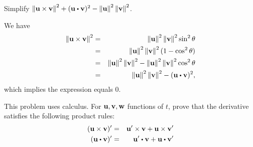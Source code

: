 \begin{ex}
  Simplify
  $\norm{\vect{u}\times \vect{v}} ^{2}+(\vect{u}\dotprod
    \vect{v}) ^{2}-\norm{\vect{u}} ^{2}\norm{ \vect{v}} ^{2}$.
  \begin{sol}
    We have
    \begin{eqnarray*}
      \norm{\vect{u}\times \vect{v}} ^{2}
      &=&\norm{\vect{u}
          } ^{2}\norm{\vect{v}} ^{2}\sin ^{2}\theta \\
      &=&\norm{\vect{u}} ^{2}\norm{\vect{v}}
          ^{2}(1-\cos ^{2}\theta) \\
      &=&\norm{\vect{u}} ^{2}\norm{\vect{v}}
          ^{2}-\norm{\vect{u}} ^{2}\norm{\vect{v}}
          ^{2}\cos ^{2}\theta \\
      &=&\norm{\vect{u}} ^{2}\norm{\vect{v}}
          ^{2}-(\vect{u}\dotprod \vect{v}) ^{2},
    \end{eqnarray*}
    which implies the expression equals $0$.
  \end{sol}
\end{ex}

\begin{ex}
  This problem uses calculus. For $\vect{u},\vect{v},\vect{w}$
  functions of $t$, prove that the derivative satisfies the following
  product rules:
  \begin{eqnarray*}
    (\vect{u}\times \vect{v}) ^{\prime }
    &=&\vect{u}^{\prime }\times
        \vect{v}+\vect{u}\times \vect{v}^{\prime } \\
    (\vect{u}\dotprod \vect{v}) ^{\prime }
    &=&\vect{u}^{\prime }\dotprod
        \vect{v}+\vect{u}\dotprod \vect{v}^{\prime }
  \end{eqnarray*}
\end{ex}

